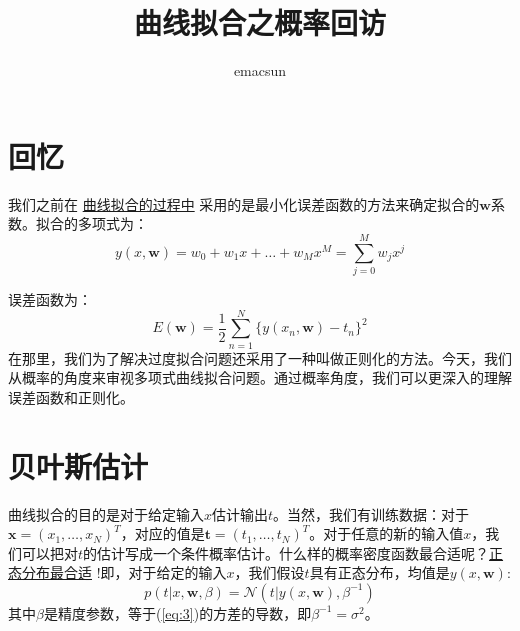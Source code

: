 \documentclass[10pt,a4paper,UTF8]{article}
\author{emacsun}
\date{}
\title{曲线拟合之概率回访}
\begin{document}
\maketitle
\tableofcontents
{}

\section{回忆}
\label{sec:orgd226b53}


我们之前在 \href{PRMLch1dot1-polynomial-curve.org}{曲线拟合的过程中} 采用的是最小化误差函数的方法来确定拟合的\(\mathbf{w}\)系数。拟合的多项式为：
\begin{equation}
\label{eq:1}
y(x, \mathbf{w}) = w_{0} + w_{1}x + \ldots + w_{M}x^{M} = \sum_{j=0}^{M}w_{j}x^{j}
\end{equation}

误差函数为：
\begin{equation}
\label{eq:2}
E( \mathbf{w}) = \frac{1}{2} \sum_{n=1}^{N}\{y(x_{n}, \mathbf{w}) - t_{n}\}^{2}
\end{equation}
在那里，我们为了解决过度拟合问题还采用了一种叫做正则化的方法。今天，我们从概率的角度来审视多项式曲线拟合问题。通过概率角度，我们可以更深入的理解误差函数和正则化。

\section{贝叶斯估计}
\label{sec:org88c1826}


曲线拟合的目的是对于给定输入\(x\)估计输出\(t\)。当然，我们有训练数据：对于\(\mathbf{x}= (x_{1},\ldots ,x_{N})^{T}\)，对应的值是\(\mathbf{t} = (t_{1},\ldots ,t_{N})^{T}\)。对于任意的新的输入值\(x\)，我们可以把对\(t\)的估计写成一个条件概率估计。什么样的概率密度函数最合适呢？\href{file://c:/Users/cliyh/AppData/Roaming/zorg/output/math/probability/afcp-normal-distribution-history.org}{正态分布最合适} !即，对于给定的输入\(x\)，我们假设\(t\)具有正态分布，均值是\(y(x, \mathbf{w})\):
\begin{equation}
\label{eq:3}
p(t|x, \mathbf{w}, \beta) = \mathcal{N} (t| y(x, \mathbf{w}), \beta^{-1})
\end{equation}
其中\(\beta\)是精度参数，等于(\ref{eq:3})的方差的导数，即\(\beta^{-1} = \sigma^{2}\)。
\end{document}
